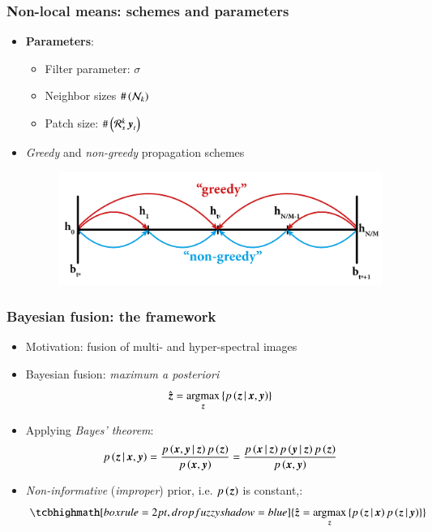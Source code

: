 \documentclass{beamer}
\let\olditem\item
\renewcommand{\item}{\setlength{\itemsep}{\fill}\olditem}
\begin{document}
\begin{frame}
\frametitle{Non-local means: schemes and parameters}
	\begin{itemize}
		\item \textbf{Parameters}: 
			\begin{itemize}
				\item Filter parameter: $ \sigma $
				\item Neighbor sizes $ \# \left( \mathcal{N}_k \right)$
				\item Patch size: $ \# \left(\mathcal{R}_s^k\operatorname{\boldsymbol{y}}_t\right) $
			\end{itemize}	
		\item \emph{Greedy} and \emph{non-greedy} propagation schemes
		\begin{figure}
		\centering
			\includegraphics[width=0.8\columnwidth]{./figures/NLM/propagation_scheme.png}
			\vspace{-0.3cm}
		\end{figure}	
	\end{itemize}
\end{frame}

\begin{frame}
\frametitle{Bayesian fusion: the framework}
	\begin{itemize}\itemsep0em
		\item Motivation: fusion of multi- and hyper-spectral images {\footnotesize \cite{hardie2004map}}
		\item Bayesian fusion:  \textit{maximum a posteriori}
		\begin{equation*}
		 \hat{\operatorname{\boldsymbol{z}}}=\operatorname*{\arg\!\max}_{\operatorname{\boldsymbol{z}}} \left\lbrace  p \left(\operatorname{\boldsymbol{z}}|\operatorname{\boldsymbol{x}},\operatorname{\boldsymbol{y}}\right) \right\rbrace 
		\end{equation*} 

		\item Applying \emph{Bayes' theorem}:
		\begin{equation*}
			p\left(\operatorname{\boldsymbol{z}}|\operatorname{\boldsymbol{x}},\operatorname{\boldsymbol{y}}\right) = \frac{p\left( \operatorname{\boldsymbol{x}},\operatorname{\boldsymbol{y}}|\operatorname{\boldsymbol{z}}\right)p\left( \operatorname{\boldsymbol{z}}\right)}{p\left( \operatorname{\boldsymbol{x}},\operatorname{\boldsymbol{y}}\right)} = \frac{p\left( \operatorname{\boldsymbol{x}}|\operatorname{\boldsymbol{z}}\right) p\left( \operatorname{\boldsymbol{y}}|\operatorname{\boldsymbol{z}}\right) p\left( \operatorname{\boldsymbol{z}}\right) }{p\left( \operatorname{\boldsymbol{x}},\operatorname{\boldsymbol{y}}\right)}
		\end{equation*} 	
		 
		\item \emph{Non-informative} (\emph{improper}) prior, i.e. $ p\left( \operatorname{\boldsymbol{z}}\right) $ is constant,: 
		\begin{equation*}
				\tcbhighmath[boxrule=2pt,drop fuzzy shadow=blue]{\hat{\z} = \argmax_{\z}\left\lbrace p\left( \z|\x\right) p\left( \z|\y\right)\right\rbrace}
		\end{equation*} 	
	\end{itemize}
\end{frame}
\end{document}
